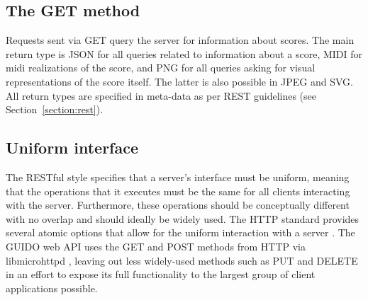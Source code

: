 \documentclass[11pt,a4paper]{article}
\begin{document}
\subsection{The GET method}\label{subsection:get}
Requests sent via GET query the server for information about scores. The main return type is JSON for all queries related to information about a score, MIDI for midi realizations of the score, and PNG for all queries asking for visual representations of the score itself.  The latter is also possible in JPEG and SVG.  All return types are specified in meta-data as per REST guidelines (see Section~\ref{section:rest}).\par
\subsection{Uniform interface}
The RESTful style specifies that a server's interface must be uniform, meaning that the operations that it executes must be the same for all clients interacting with the server.  Furthermore, these operations should be conceptually different with no overlap and should ideally be widely used.  The HTTP standard provides several atomic options that allow for the uniform interaction with a server \cite{richardson2008restful}.  The GUIDO web API uses the GET and POST methods from HTTP via libmicrohttpd \cite{libmicrohttpd}, leaving out less widely-used methods such as PUT and DELETE in an effort to expose its full functionality to the largest group of client applications possible.
\end{document}
